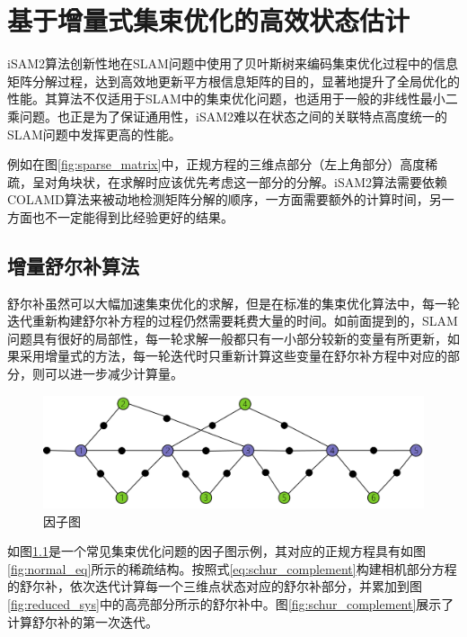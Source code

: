 \chapter{基于增量式集束优化的高效状态估计}\label{ch:ba}

iSAM2算法\cite{kaess2008isam,kaess2012isam2}创新性地在SLAM问题中使用了贝叶斯树来编码集束优化过程中的信息矩阵分解过程，达到高效地更新平方根信息矩阵的目的，显著地提升了全局优化的性能。其算法不仅适用于SLAM中的集束优化问题，也适用于一般的非线性最小二乘问题。也正是为了保证通用性，iSAM2难以在状态之间的关联特点高度统一的SLAM问题中发挥更高的性能。

例如在图\ref{fig:sparse_matrix}中，正规方程的三维点部分（左上角部分）高度稀疏，呈对角块状，在求解时应该优先考虑这一部分的分解。iSAM2算法需要依赖COLAMD\citep{davis2004algorithm}算法来被动地检测矩阵分解的顺序，一方面需要额外的计算时间，另一方面也不一定能得到比经验更好的结果。

\section{增量舒尔补算法}

舒尔补虽然可以大幅加速集束优化的求解，但是在标准的集束优化算法中，每一轮迭代重新构建舒尔补方程的过程仍然需要耗费大量的时间。如前面提到的，SLAM问题具有很好的局部性，每一轮求解一般都只有一小部分较新的变量有所更新，如果采用增量式的方法，每一轮迭代时只重新计算这些变量在舒尔补方程中对应的部分，则可以进一步减少计算量。

\begin{figure}[htb!]
    \centering
    \includegraphics[scale=.7]{figs/factor_graph.png}
    \caption{因子图}
    \label{fig:factor_graph}
\end{figure}

如图\ref{fig:factor_graph}是一个常见集束优化问题的因子图示例，其对应的正规方程具有如图\ref{fig:normal_eq}所示的稀疏结构。按照式\eqref{eq:schur_complement}构建相机部分方程的舒尔补，依次迭代计算每一个三维点状态对应的舒尔补部分，并累加到图\ref{fig:reduced_sys}中的高亮部分所示的舒尔补中。图\ref{fig:schur_complement}展示了计算舒尔补的第一次迭代。

